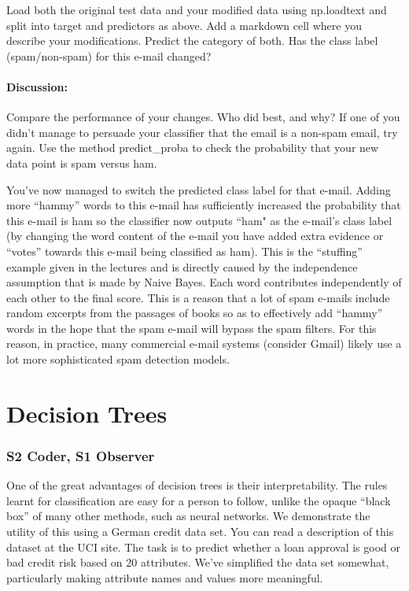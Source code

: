 \documentclass{article}
\begin{document}
Load both the original test data and  your modified data using np.loadtext and split into target and predictors as above. Add a markdown cell where you describe your modifications. Predict the category of both. Has the class label (spam/non-spam) for this e-mail changed?

\paragraph{Discussion:} Compare the performance of your changes. Who did best, and why? If one of you didn't manage to persuade your classifier that the email is a non-spam email, try again. Use the method predict\_proba to check the probability that your new data point is spam versus ham. 

You've now managed to switch the predicted class label for that e-mail. Adding more ``hammy'' words to this e-mail has sufficiently increased the probability that this e-mail is ham so the classifier now outputs ``ham" as the e-mail's class label (by changing the word content of the e-mail you have added extra evidence or ``votes'' towards this e-mail being classified as ham). This is the ``stuffing'' example given in the lectures and is directly caused by the independence assumption that is made by Naive Bayes. Each word contributes independently of each other to the final score. This is a reason that a lot of spam e-mails include random excerpts from the passages of books so as to effectively add ``hammy'' words in the hope that the spam e-mail will bypass the spam filters. For this reason, in practice, many commercial e-mail systems (consider Gmail) likely use a lot more sophisticated spam detection models.

\section{Decision Trees} 

\subsubsection*{S2 Coder, S1 Observer}

One of the great advantages of decision trees is their interpretability. The rules learnt for classification are easy for a person to follow, unlike the opaque ``black box'' of many other methods, such as neural networks. We demonstrate the utility of this using a German credit data set. You can read a description of this dataset at the UCI site. The task is to predict whether a loan approval is good or bad credit risk based on 20 attributes. We've simplified the data set somewhat, particularly making attribute names and values more meaningful.
\end{document}
